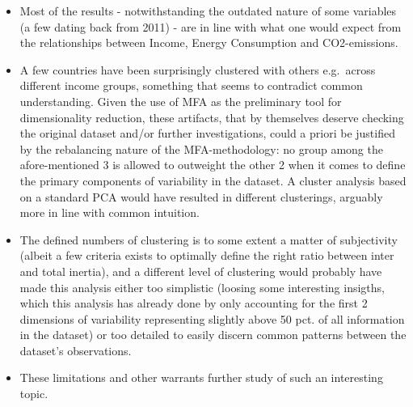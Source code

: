 \documentclass[]{article}
\begin{document}
\begin{itemize}
\item
  Most of the results - notwithstanding the outdated nature of some
  variables (a few dating back from 2011) - are in line with what one
  would expect from the relationships between Income, Energy Consumption
  and CO2-emissions.
\item
  A few countries have been surprisingly clustered with others
  e.g.~across different income groups, something that seems to
  contradict common understanding. Given the use of MFA as the
  preliminary tool for dimensionality reduction, these artifacts, that
  by themselves deserve checking the original dataset and/or further
  investigations, could a priori be justified by the rebalancing nature
  of the MFA-methodology: no group among the afore-mentioned 3 is
  allowed to outweight the other 2 when it comes to define the primary
  components of variability in the dataset. A cluster analysis based on
  a standard PCA would have resulted in different clusterings, arguably
  more in line with common intuition.
\item
  The defined numbers of clustering is to some extent a matter of
  subjectivity (albeit a few criteria exists to optimally define the
  right ratio between inter and total inertia), and a different level of
  clustering would probably have made this analysis either too
  simplistic (loosing some interesting insigths, which this analysis has
  already done by only accounting for the first 2 dimensions of
  variability representing slightly above 50 pct. of all information in
  the dataset) or too detailed to easily discern common patterns between
  the dataset's observations.
\item
  These limitations and other warrants further study of such an
  interesting topic.
\end{itemize}
\end{document}
